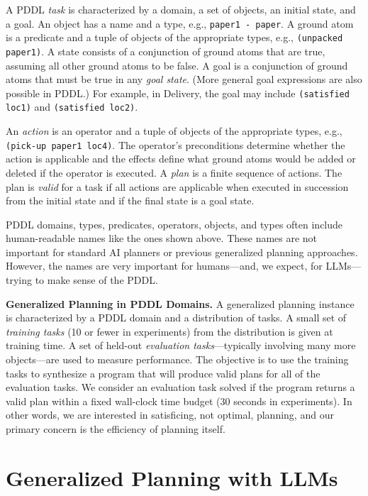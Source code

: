 \documentclass[letterpaper]{article} %
\begin{document}
A PDDL \emph{task} is characterized by a domain, a set of objects, an initial state, and a goal.
An object has a name and a type, e.g., \texttt{paper1 - paper}.
A ground atom is a predicate and a tuple of objects of the appropriate types, e.g., \texttt{(unpacked paper1)}.
% 
A state consists of a conjunction of ground atoms that are true, assuming all other ground atoms to be false.
% 
A goal is a conjunction of ground atoms that must be true in any {\em goal state}.
(More general goal expressions are also possible in PDDL.)
For example, in Delivery, the goal may include \texttt{(satisfied loc1)} and \texttt{(satisfied loc2)}.

An \emph{action} is an operator and a tuple of objects of the appropriate types, e.g., \texttt{(pick-up paper1 loc4)}.
The operator's preconditions determine whether the action is applicable and the effects define what ground atoms would be added or deleted if the operator is executed.
A \emph{plan} is a finite sequence of actions.
The plan is \emph{valid} for a task if all actions are applicable when executed in succession from the initial state and if the final state is a goal state.

PDDL domains, types, predicates, operators, objects, and types often include human-readable names like the ones shown above.
These names are not important for standard AI planners or previous generalized planning approaches.
However, the names are very important for humans---and, we expect, for LLMs---trying to make sense of the PDDL.

\textbf{Generalized Planning in PDDL Domains.}
A generalized planning instance is characterized by a PDDL domain and a distribution of tasks.
A small set of \emph{training tasks} (10 or fewer in experiments) from the distribution is given at training time.
A set of held-out \emph{evaluation tasks}---typically involving many more objects---are used to measure performance.
The objective is to use the training tasks to synthesize a program that will produce valid plans for all of the evaluation tasks.
We consider an evaluation task solved if the program returns a valid plan within a fixed wall-clock time budget (30 seconds in experiments).
In other words, we are interested in satisficing, not optimal, planning, and our primary concern is the efficiency of planning itself.

\section{Generalized Planning with LLMs}
\end{document}
